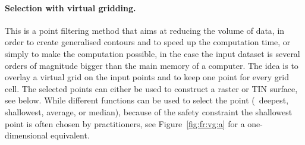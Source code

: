 \paragraph{Selection with virtual gridding.}
This is a point filtering method that aims at reducing the volume of data, in order to create generalised contours and to speed up the computation time, or simply to make the computation possible, in the case the input dataset is several orders of magnitude bigger than the main memory of a computer.
The idea is to overlay a virtual grid on the input points and to keep one point for every grid cell.
The selected points can either be used to construct a raster or TIN surface, see below.
While different functions can be used to select the point (\eg\ deepest, shallowest, average, or median), because of the safety constraint the shallowest point is often chosen by practitioners, see Figure~\ref{fig:fr:vg:a} for a one-dimensional equivalent.
